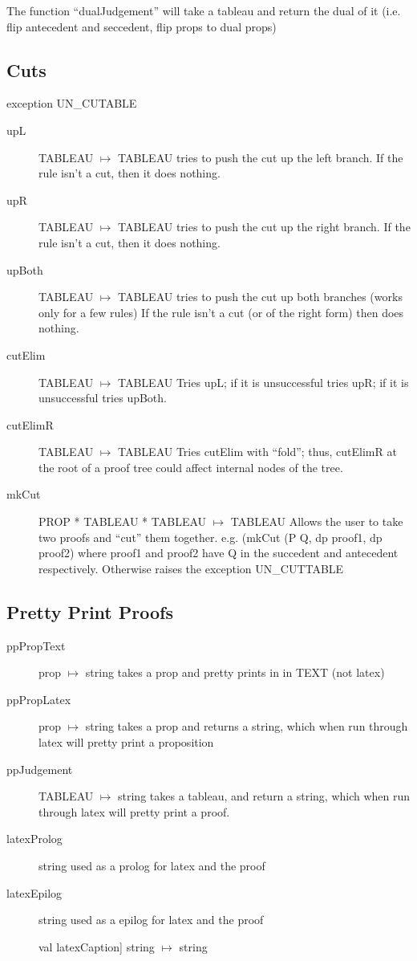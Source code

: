 \documentclass[12pt]{article}
\begin{document}
The function ``dualJudgement'' will take a tableau and return the
dual of it (i.e. flip antecedent and seccedent, flip props to dual props)


\subsection{Cuts}
exception UN\_CUTABLE

\begin{description}
\item[upL]  TABLEAU $\mapsto$  TABLEAU
	tries to push the cut up the left branch.  If the rule isn't a
	cut, then it does nothing.

\item[upR]  TABLEAU $\mapsto$  TABLEAU
	tries to push the cut up the right branch.  If the rule isn't a
	cut, then it does nothing.

\item[upBoth]  TABLEAU $\mapsto$  TABLEAU
	tries to push the cut up both branches (works only for a few rules)
	If the rule isn't a cut (or of the right form) then does nothing.

\item[cutElim]  TABLEAU $\mapsto$  TABLEAU
	Tries upL; if it is unsuccessful tries upR; if it is unsuccessful
	tries upBoth.
\item[cutElimR]  TABLEAU $\mapsto$  TABLEAU
	Tries cutElim with ``fold''; thus, cutElimR at the root of a proof
	tree could affect internal nodes of the tree.
\item[mkCut] PROP *  TABLEAU * TABLEAU $\mapsto$ TABLEAU
	Allows the user to take two proofs and ``cut'' them together.
	e.g. (mkCut (P Q, dp proof1, dp proof2)
	where proof1 and proof2 have Q in the succedent and antecedent
	respectively.  Otherwise raises the exception UN\_CUTTABLE
\end{description}


\subsection{Pretty Print Proofs}

\begin{description}
\item[ppPropText] prop $\mapsto$  string
		takes a prop and pretty prints in in TEXT (not latex)

\item[ppPropLatex] prop $\mapsto$  string
		takes a prop and returns a string, which when
		run through latex will pretty print a proposition
\item[ppJudgement] TABLEAU $\mapsto$ string
		takes a tableau, and return a string, which when
		run through latex will pretty print a proof.

\item[latexProlog] string	used as a prolog for latex and the proof

\item[latexEpilog] string	used as a epilog for latex and the proof

val latexCaption] string $\mapsto$ string
\end{description}
\end{document}
